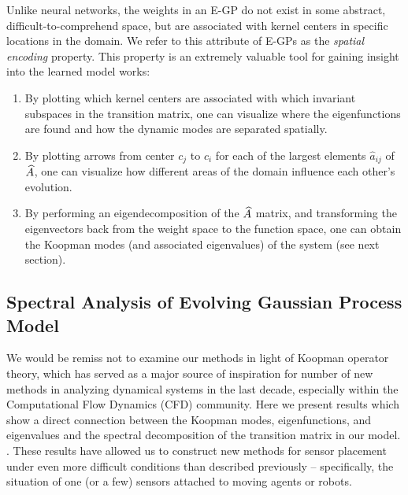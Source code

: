 Unlike neural networks, the weights in an E-GP do not exist in some abstract, difficult-to-comprehend space, but are associated with kernel centers in specific locations in the domain. We refer to this attribute of E-GPs as the \emph{spatial encoding} property. This property is an extremely valuable tool for gaining insight into the learned model works:
\begin{enumerate}
	\item By plotting which kernel centers are associated with which invariant subspaces in the transition matrix, one can visualize where the eigenfunctions are found and how the dynamic modes are separated spatially.
	\item By plotting arrows from center $c_j$ to $c_i$ for each of the largest elements $\hat a_{ij}$ of $\widehat{A}$, one can visualize how different areas of the domain influence each other's evolution.
	\item By performing an eigendecomposition of the $\widehat{A}$ matrix, and transforming the eigenvectors back from the weight space to the function space, one can obtain the Koopman modes (and associated eigenvalues) of the system (see next section).
\end{enumerate}



\subsection{Spectral Analysis of Evolving Gaussian Process Model}

We would be remiss not to examine our methods in light of Koopman operator theory, which has served as a major source of inspiration for number of new methods in analyzing dynamical systems in the last decade, especially within the Computational Flow Dynamics (CFD) community. Here we present results which show a direct connection between the Koopman modes, eigenfunctions, and eigenvalues and the spectral decomposition of the transition matrix in our model. . These results have allowed us to construct new methods for sensor placement under even more difficult conditions than described previously -- specifically, the situation of one (or a few) sensors attached to moving agents or robots.

